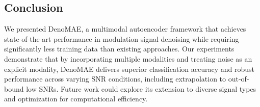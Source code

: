 \subsection{Conclusion}

We presented DenoMAE, a multimodal autoencoder framework that achieves state-of-the-art performance in modulation signal denoising while requiring significantly less training data than existing approaches. Our experiments demonstrate that by incorporating multiple modalities and treating noise as an explicit modality, DenoMAE delivers superior classification accuracy and robust performance across varying SNR conditions, including extrapolation to out-of-bound low SNRs. Future work could explore its extension to diverse signal types and optimization for computational efficiency.





